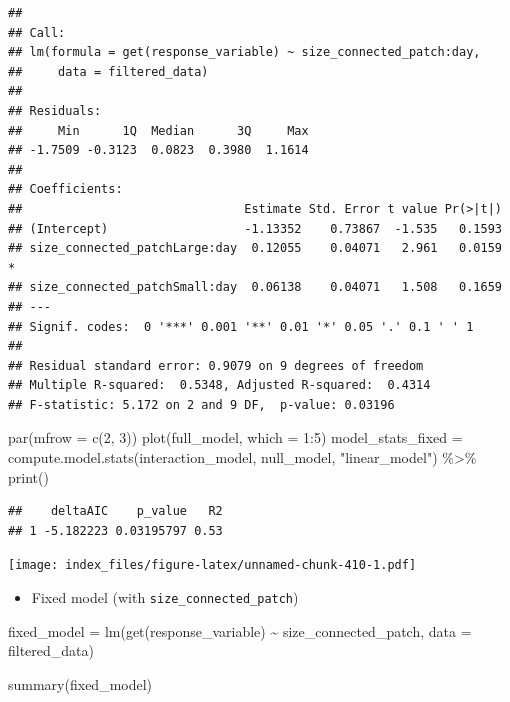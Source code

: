 \documentclass[
]{article}
\newenvironment{Shaded}{\begin{snugshade}}{\end{snugshade}}
\newcommand{\AttributeTok}[1]{\textcolor[rgb]{0.77,0.63,0.00}{#1}}
\newcommand{\DecValTok}[1]{\textcolor[rgb]{0.00,0.00,0.81}{#1}}
\newcommand{\FunctionTok}[1]{\textcolor[rgb]{0.00,0.00,0.00}{#1}}
\newcommand{\NormalTok}[1]{#1}
\newcommand{\OtherTok}[1]{\textcolor[rgb]{0.56,0.35,0.01}{#1}}
\newcommand{\SpecialCharTok}[1]{\textcolor[rgb]{0.00,0.00,0.00}{#1}}
\newcommand{\StringTok}[1]{\textcolor[rgb]{0.31,0.60,0.02}{#1}}
\providecommand{\tightlist}{%
  \setlength{\itemsep}{0pt}\setlength{\parskip}{0pt}}
\begin{document}
\begin{verbatim}
## 
## Call:
## lm(formula = get(response_variable) ~ size_connected_patch:day, 
##     data = filtered_data)
## 
## Residuals:
##     Min      1Q  Median      3Q     Max 
## -1.7509 -0.3123  0.0823  0.3980  1.1614 
## 
## Coefficients:
##                               Estimate Std. Error t value Pr(>|t|)  
## (Intercept)                   -1.13352    0.73867  -1.535   0.1593  
## size_connected_patchLarge:day  0.12055    0.04071   2.961   0.0159 *
## size_connected_patchSmall:day  0.06138    0.04071   1.508   0.1659  
## ---
## Signif. codes:  0 '***' 0.001 '**' 0.01 '*' 0.05 '.' 0.1 ' ' 1
## 
## Residual standard error: 0.9079 on 9 degrees of freedom
## Multiple R-squared:  0.5348, Adjusted R-squared:  0.4314 
## F-statistic: 5.172 on 2 and 9 DF,  p-value: 0.03196
\end{verbatim}

\begin{Shaded}
\begin{Highlighting}[]
\FunctionTok{par}\NormalTok{(}\AttributeTok{mfrow =} \FunctionTok{c}\NormalTok{(}\DecValTok{2}\NormalTok{, }\DecValTok{3}\NormalTok{))}
\FunctionTok{plot}\NormalTok{(full\_model, }\AttributeTok{which =} \DecValTok{1}\SpecialCharTok{:}\DecValTok{5}\NormalTok{)}
\NormalTok{model\_stats\_fixed }\OtherTok{=} \FunctionTok{compute.model.stats}\NormalTok{(interaction\_model,}
\NormalTok{                                        null\_model,}
                                        \StringTok{"linear\_model"}\NormalTok{) }\SpecialCharTok{\%\textgreater{}\%}
  \FunctionTok{print}\NormalTok{()}
\end{Highlighting}
\end{Shaded}

\begin{verbatim}
##    deltaAIC    p_value   R2
## 1 -5.182223 0.03195797 0.53
\end{verbatim}

\texttt{[image: index\_files/figure-latex/unnamed-chunk-410-1.pdf]}

\begin{itemize}
\tightlist
\item
  Fixed model (with \texttt{size\_connected\_patch})
\end{itemize}

\begin{Shaded}
\begin{Highlighting}[]
\NormalTok{fixed\_model }\OtherTok{=} \FunctionTok{lm}\NormalTok{(}\FunctionTok{get}\NormalTok{(response\_variable) }\SpecialCharTok{\textasciitilde{}}
\NormalTok{                   size\_connected\_patch,}
                 \AttributeTok{data =}\NormalTok{ filtered\_data)}

\FunctionTok{summary}\NormalTok{(fixed\_model)}
\end{Highlighting}
\end{Shaded}
\end{document}
